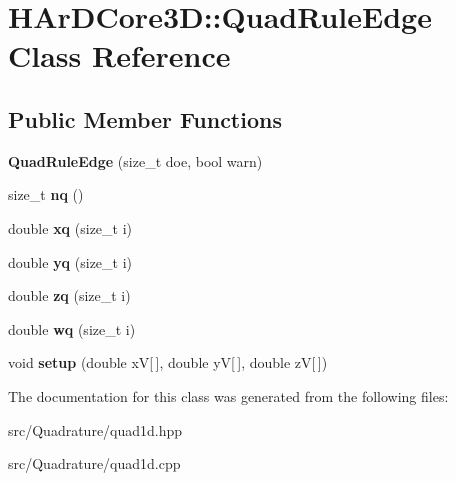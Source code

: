 \hypertarget{classHArDCore3D_1_1QuadRuleEdge}{}\section{H\+Ar\+D\+Core3D\+:\+:Quad\+Rule\+Edge Class Reference}
\label{classHArDCore3D_1_1QuadRuleEdge}
\subsection*{Public Member Functions}
\begin{DoxyCompactItemize}
\item 
\mbox{\label{classHArDCore3D_1_1QuadRuleEdge_abb254b22a706f3781b2b8a7b3fafa288}} 
{\bfseries Quad\+Rule\+Edge} (size\+\_\+t doe, bool warn)
\item 
\mbox{\label{classHArDCore3D_1_1QuadRuleEdge_af245dd9ab99a15742641d81f5508041a}} 
size\+\_\+t {\bfseries nq} ()
\item 
\mbox{\label{classHArDCore3D_1_1QuadRuleEdge_a1b03cf6a6800470a027f570d44338a1f}} 
double {\bfseries xq} (size\+\_\+t i)
\item 
\mbox{\label{classHArDCore3D_1_1QuadRuleEdge_ac272eee335dc95a46787e1a054b38cb7}} 
double {\bfseries yq} (size\+\_\+t i)
\item 
\mbox{\label{classHArDCore3D_1_1QuadRuleEdge_a2172f93f9d6679d07b37ac76f59c5282}} 
double {\bfseries zq} (size\+\_\+t i)
\item 
\mbox{\label{classHArDCore3D_1_1QuadRuleEdge_a3fc5a686c8018dbea8ec3a120ad6d9bc}} 
double {\bfseries wq} (size\+\_\+t i)
\item 
\mbox{\label{classHArDCore3D_1_1QuadRuleEdge_a362bb5fef8a2d98073605945c89aadf9}} 
void {\bfseries setup} (double xV\mbox{[}$\,$\mbox{]}, double yV\mbox{[}$\,$\mbox{]}, double zV\mbox{[}$\,$\mbox{]})
\end{DoxyCompactItemize}


The documentation for this class was generated from the following files\+:\begin{DoxyCompactItemize}
\item 
src/\+Quadrature/quad1d.\+hpp\item 
src/\+Quadrature/quad1d.\+cpp\end{DoxyCompactItemize}
